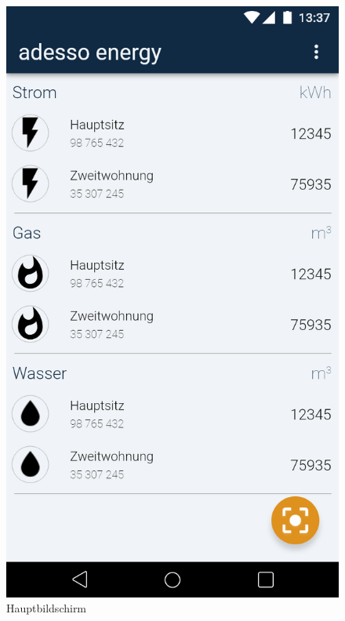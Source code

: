 \begin{figure}[h]
	\includegraphics[scale = 0.22]{img/AndroidMockup/Main}		
	\caption{Hauptbildschirm}
	\label{fig:mock-pw}
\end{figure}

